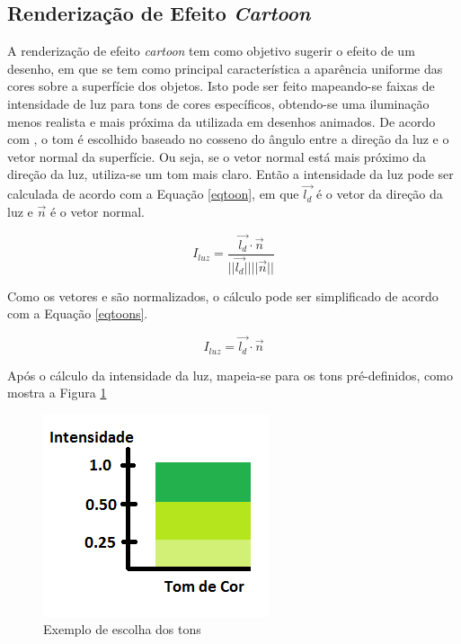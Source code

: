 {	\subsection{Renderização de Efeito \textit{Cartoon}}
	\label{cartoon}

	A renderização de efeito \textit{cartoon} tem como objetivo sugerir o efeito de um desenho, em que se tem como principal característica a aparência uniforme das cores sobre a superfície dos objetos. Isto pode ser feito mapeando-se faixas de intensidade de luz para tons de cores específicos, obtendo-se uma iluminação menos realista e mais próxima da utilizada em desenhos animados. De acordo com \cite{sbgames}, o tom é escolhido baseado no cosseno do ângulo entre a direção da luz e o vetor normal da superfície. Ou seja, se o vetor normal está mais próximo da direção da luz, utiliza-se um tom mais claro.  Então a intensidade da luz pode ser calculada de acordo com a Equação \ref{eqtoon}, em que $\overrightarrow{l_{d}}$ é o vetor da direção da luz e $\overrightarrow{n}$ é o vetor normal.

	\begin{equation}
		I_ {luz} = \frac{ \overrightarrow{l_{d}} \cdot \overrightarrow{n} } {| | \overrightarrow{l_{d}} | |  | | \overrightarrow{n} | | } 
	\label{eqtoon}
	\end{equation}

	Como os vetores  e  são normalizados, o cálculo pode ser simplificado de acordo com a Equação \ref{eqtoons}.

	\begin{equation}
		I_ {luz} =  \overrightarrow{l_{d}} \cdot \overrightarrow{n}  
	\label{eqtoons}
	\end{equation}

	Após o cálculo da intensidade da luz, mapeia-se para os tons pré-definidos, como mostra a Figura \ref{tons}

	\begin{figure}[ht]
	\centering
		\includegraphics[keepaspectratio=true,scale=1.0]{figuras/tomcor.png}
	\caption{Exemplo de escolha dos tons}
	\label{tons}
	\end{figure}

}
